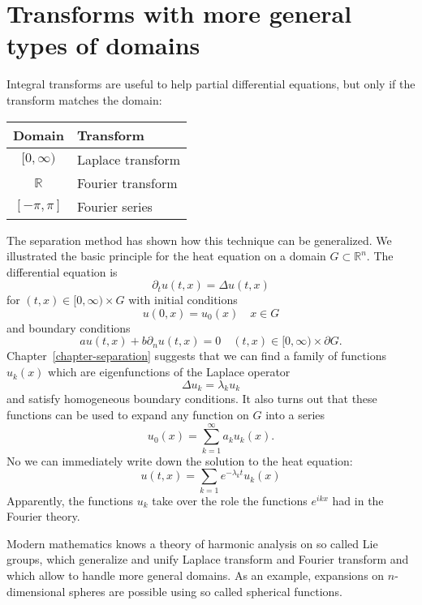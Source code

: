 %
%
%
\section{Transforms with more general types of domains}
Integral transforms are useful to help partial differential equations,
but only if the transform matches the domain:
\begin{center}
\begin{tabular}{cl}
Domain&Transform\\
\hline
$[0,\infty)$&Laplace transform\\
$\mathbb R$&Fourier transform\\
$[-\pi,\pi]$&Fourier series
\end{tabular}
\end{center}
The separation method has shown how this technique can be generalized.
We illustrated the basic principle for the heat equation on a domain
$G\subset \mathbb R^n$.
The differential equation is
\[
\partial_t u(t,x)=\Delta u(t,x)
\]
for $(t,x)\in [0,\infty)\times G$ with initial conditions
\[
u(0,x)=u_0(x) \quad x\in G
\]
and boundary conditions
\[
au(t,x)+b\partial_nu(t,x)=0\quad (t,x)\in[0,\infty)\times \partial G.
\]
Chapter~\ref{chapter-separation} suggests that we can find a family
of functions
$u_k(x)$ which are eigenfunctions of the Laplace operator
\[
\Delta u_k=\lambda_k u_k
\]
and satisfy homogeneous boundary conditions.
It also turns out that these functions can be used to expand any
function on $G$ into a series
\[
u_0(x)=\sum_{k=1}^\infty a_ku_k(x).
\]
No we can immediately write down the solution to the heat equation:
\[
u(t,x)=\sum_{k=1}e^{-\lambda_kt}u_k(x)
\]
Apparently, the functions $u_k$ take over the role the functions
$e^{ikx}$ had in the Fourier theory.

Modern mathematics knows a theory of harmonic analysis on so called
Lie groups, which generalize and unify Laplace transform and Fourier
transform and which allow to handle more general domains.
As an example, expansions on $n$-dimensional spheres are possible
using so called spherical functions.

